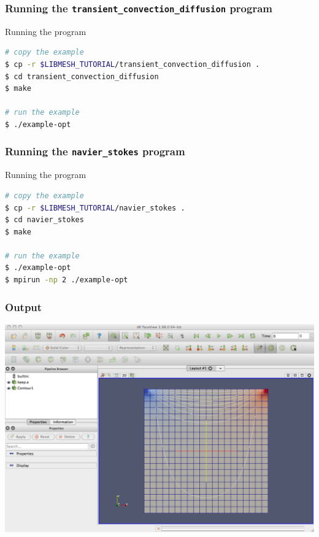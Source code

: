 \begin{frame}[fragile]
  \frametitle{Running the \texttt{transient\_convection\_diffusion} program}
    \begin{block}{Running the program}
    \begin{lstlisting}[language=bash]
# copy the example
$ cp -r $LIBMESH_TUTORIAL/transient_convection_diffusion .
$ cd transient_convection_diffusion
$ make

# run the example
$ ./example-opt
    \end{lstlisting}
  \end{block}
\end{frame}


\frame

\begin{frame}[fragile]
  \frametitle{Running the \texttt{navier\_stokes} program}
    \begin{block}{Running the program}
    \begin{lstlisting}[language=bash]
# copy the example
$ cp -r $LIBMESH_TUTORIAL/navier_stokes .
$ cd navier_stokes
$ make

# run the example
$ ./example-opt
$ mpirun -np 2 ./example-opt
    \end{lstlisting}
  \end{block}
\end{frame}


\frame
{
  \frametitle{Output}
  \begin{center}
    \includegraphics[height=0.8\textheight]{tutorial/navier_stokes/screen}
  \end{center}
} 
